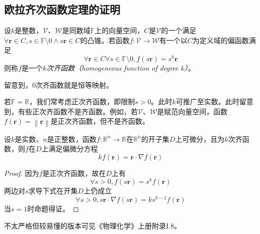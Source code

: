 \documentclass[main.tex]{subfiles}
\begin{document}
\subsection{欧拉齐次函数定理的证明}\label{sec:A.1_Euler_theorem_homogeneous_function}
\begin{definition}
    设$k$是整数，$\mathcal{V}$、$\mathcal{W}$是同数域$\mathbb{F}$上的向量空间，$C$是$\mathcal{V}$的一个满足$\forall\mathbf{r}\in C,s\in\mathbb{F}\setminus 0\wedge s\mathbf{r}\in C$的凸锥。若函数$f:\mathcal{V}\rightarrow\mathcal{W}$有一个以$C$为定义域的偏函数满足
    \[
        \forall \mathbf{r}\in C\forall s\in\mathbb{F}\setminus 0,f\left(s\mathbf{r}\right)=s^k\mathbf{r}
    \]
    则称$f$是一个\emph{$k$次齐函数（homogeneous function of degree $k$）}。
\end{definition}

留意到，0次齐函数就是恒等映射。

若$\mathbb{F}=\mathbb{R}$，我们常考虑正次齐函数，即限制$s>0$。此时$k$可推广至实数。此时留意到，有些正次齐函数不是齐函数。例如，若$\mathcal{V}$、$\mathcal{W}$是赋范向量空间，函数$f\left(\mathbf{r}\right)=\left\|\mathbf{r}\right\|$是正次齐函数，但不是齐函数。

\begin{theorem}[齐函数的欧拉定理]\label{thm:Euler_theorem_for_homogeneous_function}
    设$k$是实数、$n$是正整数，函数$f:\mathbb{R}^n\rightarrow\mathbb{R}$在$\mathbb{R}^n$的开子集$D$上可微分，且为$k$次齐函数，则$f$在$D$上满足偏微分方程
    \[kf\left(\mathbf{r}\right)=\mathbf{r}\cdot\nabla f\left(\mathbf{r}\right)\]
\end{theorem}
\begin{proof}
    因为$f$是正次齐函数，故在$D$上有
    \[\forall s>0,f\left(s\mathbf{r}\right)=s^kf\left(\mathbf{r}\right)\]
    两边对$s$求导下式在开集$D$上仍成立
    \[\forall s>0,s\mathbf{r}\cdot\nabla f\left(s\mathbf{r}\right)=ks^{k-1}f\left(\mathbf{r}\right)\]
    当$s=1$时命题得证。
\end{proof}

不太严格但较易懂的版本可见《物理化学》上册附录I.8。
\end{document}
